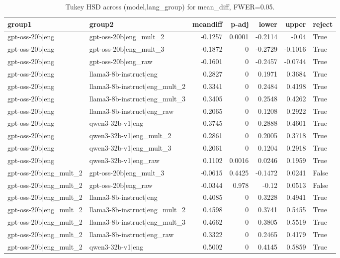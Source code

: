 \begin{table}
\caption{Tukey HSD across (model,lang_group) for mean_diff, FWER=0.05.}
\label{tab:tukey_langgroups_mean_diff}
\begin{tabular}{l l r r r r l}
\toprule
group1 & group2 & meandiff & p-adj & lower & upper & reject \\
\midrule
gpt-oss-20b|eng & gpt-oss-20b|eng_mult_2 & -0.1257 & 0.0001 & -0.2114 & -0.04 & True \\
gpt-oss-20b|eng & gpt-oss-20b|eng_mult_3 & -0.1872 & 0 & -0.2729 & -0.1016 & True \\
gpt-oss-20b|eng & gpt-oss-20b|eng_raw & -0.1601 & 0 & -0.2457 & -0.0744 & True \\
gpt-oss-20b|eng & llama3-8b-instruct|eng & 0.2827 & 0 & 0.1971 & 0.3684 & True \\
gpt-oss-20b|eng & llama3-8b-instruct|eng_mult_2 & 0.3341 & 0 & 0.2484 & 0.4198 & True \\
gpt-oss-20b|eng & llama3-8b-instruct|eng_mult_3 & 0.3405 & 0 & 0.2548 & 0.4262 & True \\
gpt-oss-20b|eng & llama3-8b-instruct|eng_raw & 0.2065 & 0 & 0.1208 & 0.2922 & True \\
gpt-oss-20b|eng & qwen3-32b-v1|eng & 0.3745 & 0 & 0.2888 & 0.4601 & True \\
gpt-oss-20b|eng & qwen3-32b-v1|eng_mult_2 & 0.2861 & 0 & 0.2005 & 0.3718 & True \\
gpt-oss-20b|eng & qwen3-32b-v1|eng_mult_3 & 0.2061 & 0 & 0.1204 & 0.2918 & True \\
gpt-oss-20b|eng & qwen3-32b-v1|eng_raw & 0.1102 & 0.0016 & 0.0246 & 0.1959 & True \\
gpt-oss-20b|eng_mult_2 & gpt-oss-20b|eng_mult_3 & -0.0615 & 0.4425 & -0.1472 & 0.0241 & False \\
gpt-oss-20b|eng_mult_2 & gpt-oss-20b|eng_raw & -0.0344 & 0.978 & -0.12 & 0.0513 & False \\
gpt-oss-20b|eng_mult_2 & llama3-8b-instruct|eng & 0.4085 & 0 & 0.3228 & 0.4941 & True \\
gpt-oss-20b|eng_mult_2 & llama3-8b-instruct|eng_mult_2 & 0.4598 & 0 & 0.3741 & 0.5455 & True \\
gpt-oss-20b|eng_mult_2 & llama3-8b-instruct|eng_mult_3 & 0.4662 & 0 & 0.3805 & 0.5519 & True \\
gpt-oss-20b|eng_mult_2 & llama3-8b-instruct|eng_raw & 0.3322 & 0 & 0.2465 & 0.4179 & True \\
gpt-oss-20b|eng_mult_2 & qwen3-32b-v1|eng & 0.5002 & 0 & 0.4145 & 0.5859 & True \\

\end{tabular}
\end{table}
